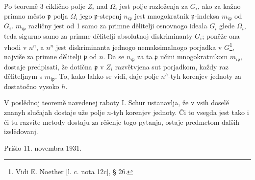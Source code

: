 \documentclass[11pt]{article}
\begin{document}
Po teoremě 3 ciklično polje \(Z_i\) nad \(\Omega_i\) jest polje razloženja za \(G_i\), ako za kažno primno město \(\mathfrak p\) polja \(\Omega_i\) jego \( \mathfrak p\)-stepenj \(n_{i\mathfrak p}\) jest mnogokratnik \( \mathfrak p\)-indeksa \(m_{i\mathfrak p}\) od \(G_i\). \(m_{i\mathfrak p}\) različny jest od 1 samo za primne dělitelji osnovnogo ideala \(G_i\) glede \(\Omega_i\), teda sigurno samo za primne dělitelji absolutnoj diskriminanty \(G_i\); poněže ona vhodi v \(n^n\), a \(n^n\) jest diskriminanta jednogo nemaksimalnogo porjadka v \(G\)\footnote{Vidi E. Noether [l. c. nota 12c], § 26.}, najviše za primne dělitelji \(\mathfrak p\) od \(n\). Da se \(n_{i\mathfrak p}\) za ta \(\mathfrak p\) učini mnogokratnikom \(m_{i\mathfrak p}\), dostaje predpisati, že dotična \(\mathfrak p\) v \(Z_i\) razvětvjena sut porjadkom, každy raz děliteljnym s \(m_{i\mathfrak p}\). To, kako lahko se vidi, daje polje \(n^h\)-tyh korenjev jednoty za dostatočno vysoko \(h\).

V poslědnoj teoremě navedenej raboty I. Schur ustanavlja, že v vsih doselě znanyh slučajah dostaje uže polje \(n\)-tyh korenjev jednoty. Či to vsegda jest tako i či tu razvite metody dostaju za rěšenje togo pytanja, ostaje predmetom dalših izslědovanj.

\begin{center}
Prišlo 11. novembra 1931.
\end{center}
\end{document}
